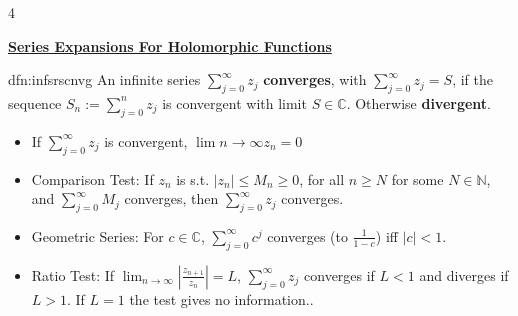 \documentclass[landscape, 8pt]{extarticle}
\begin{document}
	\newpage
	
	\begin{multicols*}{4}
		\raggedcolumns 
	
	{\footnotesize \textbf{\underline{Series Expansions For Holomorphic Functions}}}
		
		
		\begin{dfn}{dfn:infsrscnvg}{ }
			An infinite series $\sum_{j=0}^{\infty}z_j$ \textbf{converges}, with $\sum_{j=0}^{\infty}z_j = S$, if the sequence $S_n := \sum_{j =0}^{n}z_j$ is convergent with limit $S \in \mathbb{C}$. Otherwise \textbf{divergent}.
			\begin{itemize}
				\item If $\sum_{j=0}^{\infty}z_j$ is convergent, $\lim{n\to \infty} z_n = 0$
				\item Comparison Test: If $z_n$ is s.t. $\left|z_n\right| \le M_n \ge 0$, for all $n \ge N$ for some $N \in \mathbb{N}$, and $\sum_{j = 0}^{\infty} M_j$ converges, then $\sum_{j=0}^{\infty}z_j$ converges.
				\item Geometric Series: For $c \in \mathbb{C}$, $\sum_{j=0}^{\infty}c^j$ converges (to $\frac{1}{1-c}$) iff $\left|c\right| < 1$.
				\item Ratio Test: If $\lim_{n\to \infty} \left|\frac{z_{n+1}}{z_n}\right| = L$, $\sum_{j=0}^{\infty}z_j$ converges if $L < 1$ and diverges if $L > 1$. If $L = 1$ the test gives no information..
			\end{itemize}
			
		\end{dfn}
		

\end{multicols*}
\end{document}
